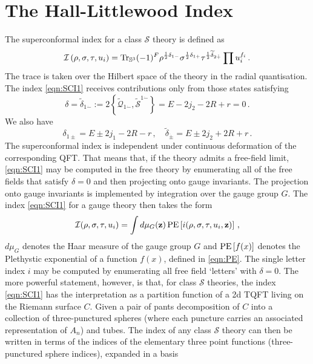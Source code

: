 \documentclass[main.tex]{subfiles}
\begin{document}
\section{The Hall-Littlewood Index}
The superconformal index for a class $\mathcal{S}$ theory is defined as \cite{Kinney:2005ej,Romelsberger:2005eg}
\begin{equation}\label{eqn:SCI1}
 \mathcal{I}\left(\rho,\sigma,\tau,u_i\right)=\operatorname{Tr}_{\mathbb{S}^3}(-1)^F\rho^{\frac{1}{2}\delta_{1-}}\sigma^{\frac{1}{2}\delta_{1+}}\tau^{\frac{1}{2}\widetilde{\delta}_{2\dot+}}\prod u_i^{f_i} \,.
\end{equation}
The trace is taken over the Hilbert space of the theory in the radial quantisation. The index \eqref{eqn:SCI1} receives contributions only from those states satisfying
\begin{equation}\label{eqn:shortening1}
\delta=\widetilde{\delta}_{1\dot-}:=2\left\{\widetilde{\mathcal{Q}}_{1\dot-},\widetilde{\mathcal{S}}^{1\dot-}\right\}=E-2j_2-2R+r=0\,.
\end{equation}
We also have
\begin{equation}
\delta_{1\pm}=E\pm 2j_1-2R-r\,,\quad \widetilde{\delta}_{\dot\pm}=E\pm 2j_2+2R+r\,.
\end{equation}
The superconformal index is independent under continuous deformation of the corresponding QFT. That means that, if the theory admits a free-field limit, \eqref{eqn:SCI1} may be computed in the free theory by enumerating all of the free fields that satisfy $\delta=0$ and then projecting onto gauge invariants. The projection onto gauge invariants is implemented by integration over the gauge group $G$. The index \eqref{eqn:SCI1} for a gauge theory then takes the form
\begin{equation} 
\mathcal{I}(\rho,\sigma,\tau,u_i)=\int d\mu_{G}(\mathbf{z}) \operatorname{\mathrm{PE}}\left[i(\rho,\sigma,\tau,u_i,\mathbf{z})\right] \, ,
\end{equation}
$d\mu_{G}$ denotes the Haar measure of the gauge group $G$ and $\operatorname{\mathrm{PE}}\left[f(x)\right]$ denotes the Plethystic exponential of a function $f(x)$, defined in \eqref{eqn:PE}.
The single letter index $i$ may be computed by enumerating all free field `letters' with $\delta=0$.
The more powerful statement, however, is that, for class $\mathcal{S}$ theories, the index \eqref{eqn:SCI1} has the interpretation as a partition function of a 2d TQFT living on the Riemann surface $C$. 
Given a pair of pants decomposition of $C$ into a collection of three-punctured spheres (where each puncture carries an associated representation of $A_n$) and tubes. The index of any class $\mathcal{S}$ theory can then be written in terms of the indices of the elementary three point functions (three-punctured sphere indices), expanded in a basis
\end{document}
